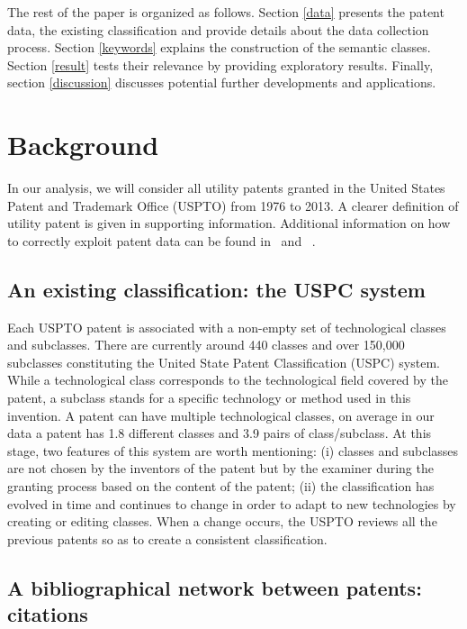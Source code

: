 \documentclass[10pt,A4]{article}
\begin{document}
The rest of the paper is organized as follows. Section \ref{data} presents the patent data, the existing classification and provide details about the data collection process. Section \ref{keywords} explains the construction of the semantic classes. Section \ref{result} tests their relevance by providing exploratory results. Finally, section \ref{discussion} discusses potential further developments and applications.


\section{Background \label{data}}

In our analysis, we will consider all utility patents granted in the United States Patent and Trademark Office (USPTO) from 1976 to 2013. A clearer definition of utility patent is given in supporting information. Additional information on how to correctly exploit patent data can be found in~\cite{hall2001} and ~\cite{lerner2015use}.

\subsection{An existing classification: the USPC system}

Each USPTO patent is associated with a non-empty set of technological classes and subclasses. There are currently around 440 classes and over 150,000 subclasses constituting the United State Patent Classification (USPC) system. While a technological class corresponds to the technological field covered by the patent, a subclass stands for a specific technology or method used in this invention. A patent can have multiple technological classes, on average in our data a patent has 1.8 different classes and 3.9 pairs of class/subclass. At this stage, two features of this system are worth mentioning: (i) classes and subclasses are not chosen by the inventors of the patent but by the examiner during the granting process based on the content of the patent; (ii) the classification has evolved in time and continues to change in order to adapt to new technologies by creating or editing classes. When a change occurs, the USPTO reviews all the previous patents so as to create a consistent classification.

\subsection{A bibliographical network between patents: citations \label{sub:citation}}
\end{document}
